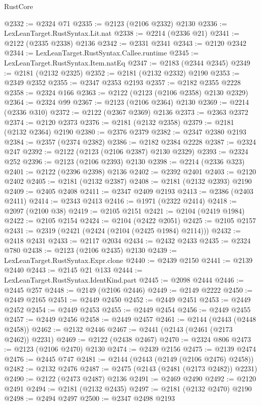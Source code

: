 \begin{lexlean}{RustCore}
\begin{coremodule}
@2332 := @2324 @71
@2335 := @2123 (@2106 @2332) @2130
@2336 := LexLeanTarget.RustSyntax.Lit.nat
@2338 := @2214 (@2336 @21)
@2341 := @2122 (@2335 @2338) @2136
@2342 := @2331 @2341
@2343 := @2120 @2342
@2344 := LexLeanTarget.RustSyntax.Callee.runtime
@2345 := LexLeanTarget.RustSyntax.Item.natEq
@2347 := @2183 (@2344 @2345)
@2349 := @2181 (@2132 @2325)
@2352 := @2181 (@2132 @2332) @2190
@2353 := @2349 @2352
@2355 := @2347 @2353 @2193
@2357 := @2182 @2355 @2228
@2358 := @2324 @166
@2363 := @2122 (@2123 (@2106 @2358) @2130 @2329)
@2364 := @2324 @99
@2367 := @2123 (@2106 @2364) @2130
@2369 := @2214 (@2336 @310)
@2372 := @2122 (@2367 @2369) @2136
@2373 := @2363 @2372
@2374 := @2120 @2373
@2376 := @2181 (@2132 @2358)
@2379 := @2181 (@2132 @2364) @2190
@2380 := @2376 @2379
@2382 := @2347 @2380 @2193
@2384 := @2357 (@2374 @2382)
@2386 := @2182 @2384 @2228
@2387 := @2324 @247
@2392 := @2122 (@2123 (@2106 @2387) @2130 @2329)
@2393 := @2324 @252
@2396 := @2123 (@2106 @2393) @2130
@2398 := @2214 (@2336 @323)
@2401 := @2122 (@2396 @2398) @2136
@2402 := @2392 @2401
@2403 := @2120 @2402
@2405 := @2181 (@2132 @2387)
@2408 := @2181 (@2132 @2393) @2190
@2409 := @2405 @2408
@2411 := @2347 @2409 @2193
@2413 := @2386 (@2403 @2411)
@2414 := @2343 @2413
@2416 := @1971 (@2322 @2414)
@2418 := @2097 (@2100 @38)
@2419 := @2105 @2151
@2421 := @2104 (@2419 @1984)
@2422 := @2105 @2154
@2424 := @2104 (@2422 @2051)
@2425 := @2105 @2157
@2431 := @2319 (@2421 (@2424 (@2104 (@2425 @1984) @2114)))
@2432 := @2418 @2431
@2433 := @2117 @2034
@2434 := @2432 @2433
@2435 := @2324 @780
@2438 := @2123 (@2106 @2435) @2130
@2439 := LexLeanTarget.RustSyntax.Expr.clone
@2440 := @2439 @2150
@2441 := @2139 @2440
@2443 := @2145 @21 @133
@2444 := LexLeanTarget.RustSyntax.IdentKind.part
@2445 := @2098 @2444
@2446 := @2445 @257
@2448 := @2149 (@2106 @2446)
@2449 := @2149 @2222
@2450 := @2449 @2165
@2451 := @2449 @2450
@2452 := @2449 @2451
@2453 := @2449 @2452
@2454 := @2449 @2453
@2455 := @2449 @2454
@2456 := @2449 @2455
@2457 := @2449 @2456
@2458 := @2449 @2457
@2461 := @2144 (@2443 (@2448 @2458))
@2462 := @2132 @2446
@2467 := @2441 (@2143 (@2461 (@2173 @2462)) @2231)
@2469 := @2122 (@2438 @2467)
@2470 := @2324 @806
@2473 := @2123 (@2106 @2470) @2130
@2474 := @2439 @2156
@2475 := @2139 @2474
@2476 := @2445 @747
@2481 := @2144 (@2443 (@2149 (@2106 @2476) @2458))
@2482 := @2132 @2476
@2487 := @2475 (@2143 (@2481 (@2173 @2482)) @2231)
@2490 := @2122 (@2473 @2487) @2136
@2491 := @2469 @2490
@2492 := @2120 @2491
@2494 := @2181 (@2132 @2435)
@2497 := @2181 (@2132 @2470) @2190
@2498 := @2494 @2497
@2500 := @2347 @2498 @2193

\end{coremodule}
\end{lexlean}

